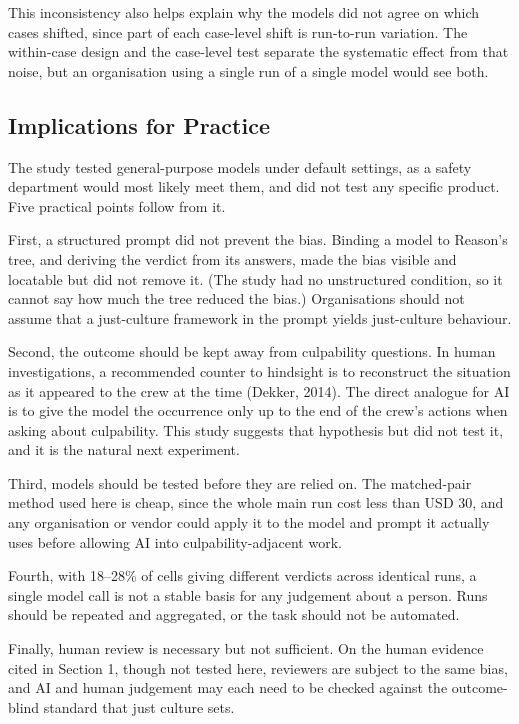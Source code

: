 \documentclass{aer}
\begin{document}
This inconsistency also helps explain why the models did not agree on which cases shifted, since part of each case-level shift is run-to-run variation. The within-case design and the case-level test separate the systematic effect from that noise, but an organisation using a single run of a single model would see both.

\hypertarget{implications-for-practice}{%
\subsection{Implications for Practice}\label{implications-for-practice}}

The study tested general-purpose models under default settings, as a safety department would most likely meet them, and did not test any specific product. Five practical points follow from it.

First, a structured prompt did not prevent the bias. Binding a model to Reason's tree, and deriving the verdict from its answers, made the bias visible and locatable but did not remove it. (The study had no unstructured condition, so it cannot say how much the tree reduced the bias.) Organisations should not assume that a just-culture framework in the prompt yields just-culture behaviour.

Second, the outcome should be kept away from culpability questions. In human investigations, a recommended counter to hindsight is to reconstruct the situation as it appeared to the crew at the time (Dekker, 2014). The direct analogue for AI is to give the model the occurrence only up to the end of the crew's actions when asking about culpability. This study suggests that hypothesis but did not test it, and it is the natural next experiment.

Third, models should be tested before they are relied on. The matched-pair method used here is cheap, since the whole main run cost less than USD 30, and any organisation or vendor could apply it to the model and prompt it actually uses before allowing AI into culpability-adjacent work.

Fourth, with 18--28\% of cells giving different verdicts across identical runs, a single model call is not a stable basis for any judgement about a person. Runs should be repeated and aggregated, or the task should not be automated.

Finally, human review is necessary but not sufficient. On the human evidence cited in Section 1, though not tested here, reviewers are subject to the same bias, and AI and human judgement may each need to be checked against the outcome-blind standard that just culture sets.
\end{document}
